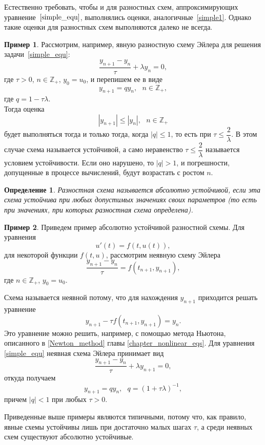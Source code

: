 \documentclass[11pt,a4paper,twoside]{report}
\numberwithin{equation}{section}
\newtheorem*{definition}{Определение}
\theoremstyle{definition}
\newtheorem{example}{Пример}[section]
\theoremstyle{plain}
\begin{document}
Естественно требовать, чтобы и для разностных схем, аппроксимирующих
уравнение~$\eqref{simple_equ}$, выполнялись оценки, аналогичные~\eqref{simple1}.
Однако такие оценки для разностных схем выполняются далеко не всегда.

%
\begin{example}
%
    \label{5_4_example_1}
    Рассмотрим, например, явную разностную схему Эйлера для решения задачи~\eqref{simple_equ}:
    $$
        \dfrac{y_{n+1}-y_n}{\tau} + \lambda y_n = 0,
    $$
    где $\tau > 0$, $n \in \mathbb{Z}_+$, $y_0 = u_0$, и перепишем ее в виде
    $$
        y_{n+1} = qy_n,~~~n \in \mathbb{Z}_+,
    $$
    где $q = 1-\tau\lambda$.\\
    Тогда оценка
    $$
        |y_{n+1}| \leqslant |y_n|,~~~n \in \mathbb{Z}_+
    $$
    будет выполняться тогда и только тогда, когда $|q| \leqslant 1$, то есть при
    $\tau \leqslant \dfrac{2}{\lambda}$. В этом случае схема называется устойчивой,
    а само неравенство $\tau \leqslant \dfrac{2}{\lambda}$
    называется условием устойчивости. Если оно нарушено, то $|q|>1$, и погрешности,
    допущенные в процессе вычислений, будут возрастать с ростом $n$.
%
\end{example}
%
\begin{definition}
%
    Разностная схема называется абсолютно устойчивой,
    если эта схема устойчива при любых допустимых значениях своих параметров
    (то есть при значениях, при которых разностная схема определена).
%
\end{definition}
%

%
\begin{example}
%
Приведем пример абсолютно устойчивой разностной схемы. Для уравнения
%
\begin{equation}
%
    \label{5_4_2_example}
    u'(t)=f(t,u(t)),
%
\end{equation}
%
для некоторой функции $f(t,u)$, рассмотрим неявную схему Эйлера
%
$$
    \dfrac{y_{n+1}-y_n}{\tau} = f(t_{n+1},y_{n+1}),
$$
%
где $n \in \mathbb{Z}_+$, $y_0=u_0$.

Схема называется неявной потому, что для нахождения $y_{n+1}$ приходится
решать уравнение
%
$$
    y_{n+1}-\tau f(t_{n+1},y_{n+1}) = y_n.
$$
%
Это уравнение можно решить, например, с помощью метода Ньютона, описанного
в \ref{Newton_method} главы \ref{chapter_nonlinear_eqs}. Для уравнения
\eqref{simple_equ} неявная схема Эйлера принимает вид
%
$$
    \dfrac{y_{n+1}-y_n}{\tau} + \lambda y_{n+1} = 0,
$$
%
откуда получаем
%
$$
    y_{n+1}=qy_n,~~~q=(1+\tau\lambda)^{-1},
$$
%
причем $|q|<1$ при любых $\tau>0$.
%
\end{example}
%
Приведенные выше примеры являются типичными, потому что, как правило, явные
схемы устойчивы лишь при достаточно малых шагах $\tau$, а среди неявных схем
существуют абсолютно устойчивые.
\end{document}
